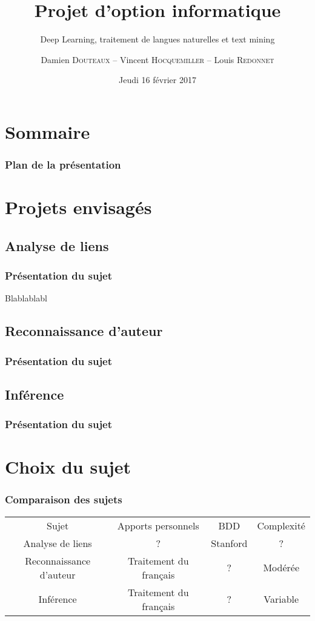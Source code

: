 \documentclass{beamer}
\title{Projet d'option informatique}
\subtitle{Deep Learning, traitement de langues naturelles et text mining}
\author{Damien \textsc{Douteaux} -- Vincent \textsc{Hocquemiller} -- Louis \textsc{Redonnet}}
\date{Jeudi 16 février 2017}
\begin{document}
\begin{frame}[plain]
	\titlepage
\end{frame}

\section{Sommaire}

\begin{frame}
	\frametitle{Plan de la présentation}
	\tableofcontents
\end{frame}

\section{Projets envisagés}

\subsection{Analyse de liens}
\begin{frame}
	\frametitle{Présentation du sujet}
	Blablablabl	
\end{frame}

\iffalse

\subsection{Reconnaissance d'auteur}
\begin{frame}
	\frametitle{Présentation du sujet}
	
\end{frame}

\subsection{Inférence}
\begin{frame}
	\frametitle{Présentation du sujet}

\end{frame}

\section{Choix du sujet}

\begin{frame}
	\frametitle{Comparaison des sujets}
	\begin{table}[ht]
		\centering
		\begin{tabular}{cccc}
			Sujet & Apports personnels & BDD & Complexité \\
			Analyse de liens & ? & Stanford & ? \\
			Reconnaissance d'auteur & Traitement du français & ? & Modérée \\
			Inférence & Traitement du français & ? & Variable \\ 
		\end{tabular}
	\end{table}
\end{frame}
\end{document}
